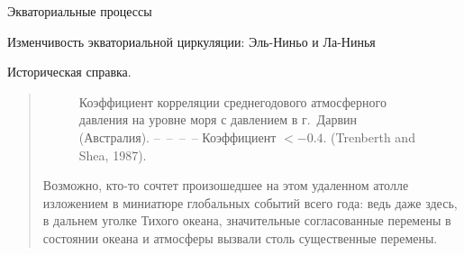 \begin{chapter}{Экваториальные процессы}
\begin{section}{Изменчивость экваториальной циркуляции: Эль-Ниньо и Ла-Нинья}
\begin{paragraph}{Историческая справка.}
\begin{quotation}
\begin{figure}[b!]
\begin{center}
\end{center}
\caption{Коэффициент корреляции среднегодового атмосферного давления на уровне
моря с давлением в г.~Дарвин (Австралия). 
--\ --\ --\ -- Коэффициент $< -0.4$. (Trenberth and Shea, 1987).}
\label{fig:ensocorrelations}
\end{figure}
%
%

Возможно, кто-то сочтет произошедшее на этом удаленном атолле изложением 
в миниатюре глобальных событий всего года: ведь даже здесь, в дальнем уголке
Тихого океана, значительные согласованные перемены в состоянии океана и
атмосферы вызвали столь существенные перемены.
%


\end{quotation}
\end{paragraph}
\end{section}
\end{chapter}
